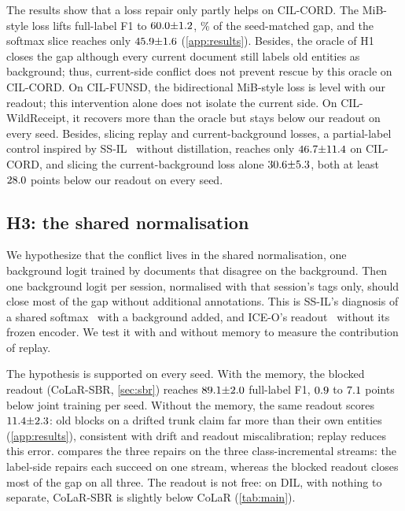 \documentclass[10pt,twocolumn,letterpaper]{article}
\begin{document}
The results show that a loss repair only partly helps on CIL-CORD. The MiB-style loss lifts full-label F1 to $60.0{\pm}1.2$, \nMibShareFull\% of the seed-matched gap, and the softmax slice reaches only $45.9{\pm}1.6$ (\cref{app:results}). Besides, the oracle of H1 closes the gap although every current document still labels old entities as background; thus, current-side conflict does not prevent rescue by this oracle on CIL-CORD. On CIL-FUNSD, the bidirectional MiB-style loss is level with our readout; this intervention alone does not isolate the current side. On CIL-WildReceipt, it recovers more than the oracle but stays below our readout on every seed. Besides, slicing replay and current-background losses, a partial-label control inspired by SS-IL~\citep{ahn2021ssil} without distillation, reaches only $46.7{\pm}11.4$ on CIL-CORD, and slicing the current-background loss alone $30.6{\pm}5.3$, both at least $28.0$ points below our readout on every seed.

\subsection{H3: the shared normalisation}
\label{sec:h3}
We hypothesize that the conflict lives in the shared normalisation, one background logit trained by documents that disagree on the background. Then one background logit per session, normalised with that session's tags only, should close most of the gap without additional annotations. This is SS-IL's diagnosis of a shared softmax~\citep{ahn2021ssil} with a background added, and ICE-O's readout~\citep{liu2023ice} without its frozen encoder. We test it with and without memory to measure the contribution of replay.

The hypothesis is supported on every seed. With the memory, the blocked readout (CoLaR-SBR, \cref{sec:sbr}) reaches $89.1{\pm}2.0$ full-label F1, $0.9$ to $7.1$ points below joint training per seed. Without the memory, the same readout scores $11.4{\pm}2.3$: old blocks on a drifted trunk claim far more than their own entities (\cref{app:results}), consistent with drift and readout miscalibration; replay reduces this error.  compares the three repairs on the three class-incremental streams: the label-side repairs each succeed on one stream, whereas the blocked readout closes most of the gap on all three. The readout is not free: on DIL, with nothing to separate, CoLaR-SBR is slightly below CoLaR (\cref{tab:main}).
\end{document}
